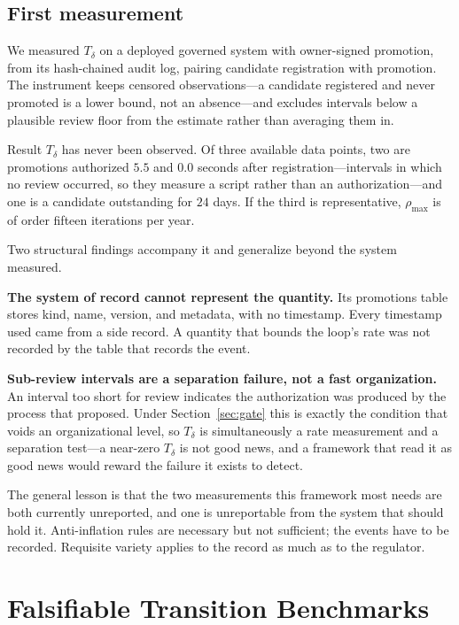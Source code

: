 \documentclass[11pt]{article}
\newcommand{\Td}{\ensuremath{T_\delta}}
\begin{document}
\subsection{First measurement}

We measured \Td{} on a deployed governed system with owner-signed promotion, from its hash-chained audit log, pairing candidate registration with promotion. The instrument keeps censored observations---a candidate registered and never promoted is a lower bound, not an absence---and excludes intervals below a plausible review floor from the estimate rather than averaging them in.

\begin{cautionbox}{Result}
\Td{} has never been observed. Of three available data points, two are promotions authorized $5.5$ and $0.0$ seconds after registration---intervals in which no review occurred, so they measure a script rather than an authorization---and one is a candidate outstanding for $24$ days. If the third is representative, $\rho_{\max}$ is of order fifteen iterations per year.
\end{cautionbox}

Two structural findings accompany it and generalize beyond the system measured.

\textbf{The system of record cannot represent the quantity.} Its promotions table stores kind, name, version, and metadata, with no timestamp. Every timestamp used came from a side record. A quantity that bounds the loop's rate was not recorded by the table that records the event.

\textbf{Sub-review intervals are a separation failure, not a fast organization.} An interval too short for review indicates the authorization was produced by the process that proposed. Under Section~\ref{sec:gate} this is exactly the condition that voids an organizational level, so \Td{} is simultaneously a rate measurement and a separation test---a near-zero \Td{} is not good news, and a framework that read it as good news would reward the failure it exists to detect.

The general lesson is that the two measurements this framework most needs are both currently unreported, and one is unreportable from the system that should hold it. Anti-inflation rules are necessary but not sufficient; the events have to be recorded. Requisite variety \citep{ashby1956introduction} applies to the record as much as to the regulator.

\section{Falsifiable Transition Benchmarks}
\end{document}
